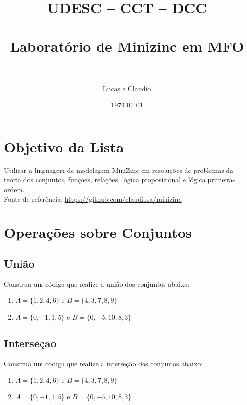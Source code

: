 \documentclass[paper=a4, fontsize=11pt]{scrartcl} %
\title{	
\normalfont \normalsize 
\textsc{{\huge UDESC -- CCT -- DCC}} \\ [25pt] %
\horrule{2pt} \\[0.4cm] %
\huge Laboratório de Minizinc em MFO \\ %
\horrule{2pt} \\[0.5cm] %
}
\author{Lucas e Claudio} %
\date{\normalsize\today} %
\numberwithin{equation}{section} %
\numberwithin{figure}{section} %
\numberwithin{table}{section} %
\begin{document}
\maketitle %


\section{Objetivo da Lista}

Utilizar a linguagem de modelagem MiniZinc em resoluções
de problemas da teoria dos conjuntos, funções, relações, 
lógica proposicional e lógica  primeira-ordem.\\

Fonte de referência: \url{https://github.com/claudiosa/minizinc}

\tableofcontents


\newpage
\section{Operações sobre Conjuntos}

\subsection{União}

Construa um código que realize a união dos conjuntos abaixo:
\begin{enumerate}

\item $A = \{ 1, 2, 4, 6\}$ e $B = \{ 4, 3, 7, 8, 9 \}$

\item $A = \{ 0, -1, 1, 5\}$ e $B = \{ 0, -5, 10, 8, 3 \}$


\end{enumerate}


\subsection{Interseção}

Construa um código que realize a interseção dos conjuntos abaixo:
\begin{enumerate}

\item $A = \{ 1, 2, 4, 6\}$ e $B = \{ 4, 3, 7, 8, 9 \}$

\item $A = \{ 0, -1, 1, 5\}$ e $B = \{ 0, -5, 10, 8, 3 \}$


\end{enumerate}
\end{document}
